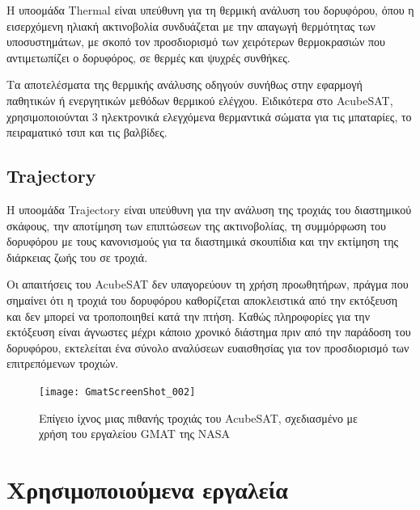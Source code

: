 \documentclass[a4paper,nobib]{tufte-book}
\begin{document}
Η υποομάδα Thermal είναι υπεύθυνη για τη θερμική ανάλυση του δορυφόρου, όπου η εισερχόμενη ηλιακή ακτινοβολία συνδυάζεται με την απαγωγή θερμότητας των υποσυστημάτων, με σκοπό τον προσδιορισμό των χειρότερων θερμοκρασιών που αντιμετωπίζει ο δορυφόρος, σε θερμές και ψυχρές συνθήκες.

Τα αποτελέσματα της θερμικής ανάλυσης οδηγούν συνήθως στην εφαρμογή παθητικών ή ενεργητικών μεθόδων θερμικού ελέγχου. Ειδικότερα στο AcubeSAT, χρησιμοποιούνται 3 ηλεκτρονικά ελεγχόμενα θερμαντικά σώματα για τις μπαταρίες, το πειραματικό τσιπ και τις βαλβίδες.

\subsection{Trajectory}

Η υποομάδα Trajectory είναι υπεύθυνη για την ανάλυση της τροχιάς του διαστημικού σκάφους, την αποτίμηση των επιπτώσεων της ακτινοβολίας, τη συμμόρφωση του δορυφόρου με τους κανονισμούς για τα διαστημικά σκουπίδια και την εκτίμηση της διάρκειας ζωής του σε τροχιά.

Οι απαιτήσεις του AcubeSAT δεν υπαγορεύουν τη χρήση προωθητήρων, πράγμα που σημαίνει ότι η τροχιά του δορυφόρου καθορίζεται αποκλειστικά από την εκτόξευση και δεν μπορεί να τροποποιηθεί κατά την πτήση. Καθώς πληροφορίες για την εκτόξευση είναι άγνωστες μέχρι κάποιο χρονικό διάστημα πριν από την παράδοση του δορυφόρου, εκτελείται ένα σύνολο αναλύσεων ευαισθησίας για τον προσδιορισμό των επιτρεπόμενων τροχιών. \autocite{MDO,anthopoulos_orbital_analysis_2020}
\begin{figure}
	\texttt{[image: GmatScreenShot\_002]}
	\caption[Επίγειο ίχνος μιας πιθανής τροχιάς του AcubeSAT]{Επίγειο ίχνος μιας πιθανής τροχιάς του AcubeSAT, σχεδιασμένο με χρήση του εργαλείου \acl{GMAT} της NASA}
	\label{fig:gmat}
\end{figure}


\section{Χρησιμοποιούμενα εργαλεία}
\end{document}
